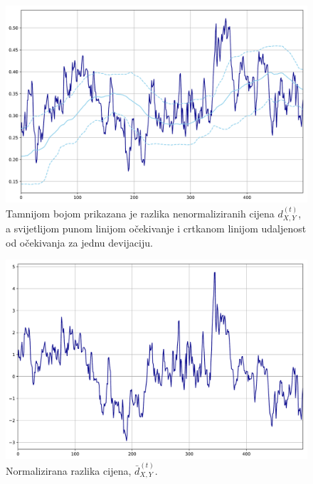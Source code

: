 \documentclass[lmodern, utf8, diplomski, numeric]{fer}
\newcommand{\norm}[1]{\bar{#1}}
\newcommand{\q}{\left}
\newcommand{\w}{\right}
\begin{document}
  \begin{figure}[H]
    \centering
    \includegraphics[width=1.0\linewidth]{graphics/diff.pdf}
    \caption{Tamnijom bojom prikazana je razlika nenormaliziranih cijena $d_{X,Y}^{(t)}$, a svijetlijom punom linijom očekivanje i crtkanom linijom udaljenost od očekivanja za jednu devijaciju.}
    \label{fig:diff}
  \end{figure}

  \begin{figure}[H]
    \centering
    \includegraphics[width=1.0\linewidth]{graphics/diff-norm.pdf}
    \caption{
      Normalizirana razlika cijena, $\norm{d}_{X,Y}^{\q(t\w)}$.}
    \label{fig:diff-norm}
  \end{figure}
  
\end{document}
